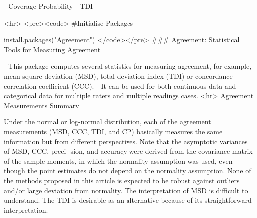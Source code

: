 - Coverage Probability 
- TDI

<hr>
<pre><code>
#Initialise Packages

install.packages("Agreement")
</code></pre>
### Agreement: Statistical Tools for Measuring Agreement

- This package computes several statistics for measuring agreement, for example, mean square deviation (MSD), total deviation index (TDI) or concordance correlation coefficient (CCC). 
- It can be used for both continuous data and categorical data for multiple raters and multiple readings cases.
<hr>
Agreement Measurements Summary 

Under the normal or log-normal distribution, each of the agreement measurements (MSD, CCC, TDI, and CP) 
basically measures the same information but from different perspectives. Note that the asymptotic variances 
of MSD, CCC, preci- sion, and accuracy were derived from the covariance matrix of
the sample moments, in which the normality assumption was used, even though the point estimates do not 
depend on the normality assumption. None of the methods proposed in this article is expected to be 
robust against outliers and/or large deviation from normality. The interpretation of MSD is 
difficult to understand. The TDI is desirable as an alternative because of its straightforward
interpretation. 
